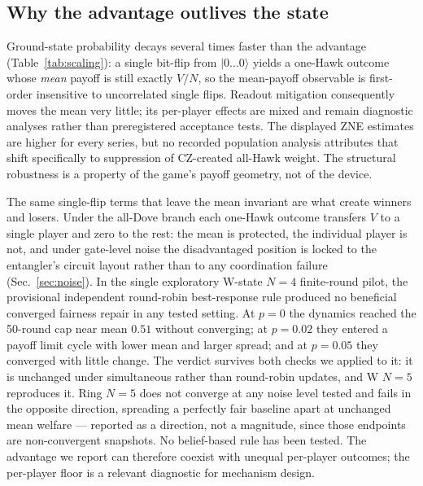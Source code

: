 \documentclass[conference]{IEEEtran}
\newcommand{\ket}[1]{\ensuremath{|#1\rangle}}
\begin{document}
\subsection{Why the advantage outlives the state}
Ground-state probability decays several times faster than the advantage
(Table~\ref{tab:scaling}): a single bit-flip from $\ket{0\ldots0}$ yields a
one-Hawk outcome whose \emph{mean} payoff is still exactly $V/N$, so the
mean-payoff observable is first-order insensitive to uncorrelated single
flips. Readout mitigation consequently moves the mean very little; its
per-player effects are mixed and remain diagnostic analyses rather than
preregistered acceptance tests. The displayed ZNE estimates are higher for
every series, but no recorded population analysis attributes that shift
specifically to suppression of CZ-created all-Hawk weight. The structural
robustness is a property of the game's payoff geometry, not of the device.

The same single-flip terms that leave the mean invariant are what create
winners and losers. Under the all-Dove branch each one-Hawk outcome transfers
$V$ to a single player and zero to the rest: the mean is protected, the
individual player is not, and under gate-level noise the disadvantaged
position is locked to the entangler's circuit layout rather than to any
coordination failure (Sec.~\ref{sec:noise}).
In the single exploratory W-state $N{=}4$ finite-round pilot, the provisional
independent round-robin best-response rule produced no beneficial converged
fairness repair in any tested setting. At $p{=}0$ the dynamics reached the
50-round cap near mean $0.51$ without converging; at $p{=}0.02$ they entered a
payoff limit cycle with lower mean and larger spread; and at $p{=}0.05$ they
converged with little change. The verdict survives both checks we applied to it:
it is unchanged under simultaneous rather than round-robin updates, and W
$N{=}5$ reproduces it. Ring $N{=}5$ does not converge at any noise level tested
and fails in the opposite direction, spreading a perfectly fair baseline apart
at unchanged mean welfare --- reported as a direction, not a magnitude, since
those endpoints are non-convergent snapshots. No belief-based rule has been
tested. The advantage we
report can therefore coexist with unequal per-player outcomes; the per-player
floor is a relevant diagnostic for mechanism design.
\end{document}
